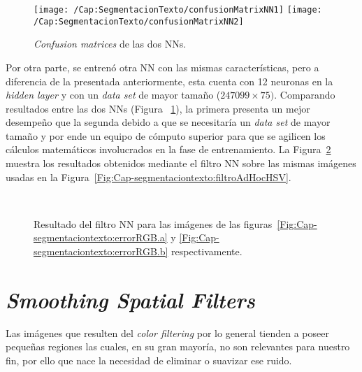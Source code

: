 \begin{figure}[h!]
	\centering
  \texttt{[image: /Cap:SegmentacionTexto/confusionMatrixNN1]} { }
	\texttt{[image: /Cap:SegmentacionTexto/confusionMatrixNN2]}
	\caption{\textit{Confusion matrices} de las dos NNs.}
	\label{Fig:Cap-segmentaciontexto:confusionMatrixNNs}
\end{figure}

Por otra parte, se entrenó otra NN con las mismas características, pero a 
diferencia de la presentada anteriormente, esta cuenta con 12 neuronas en la
\textit{hidden layer} y con un \textit{data set} de mayor tamaño ($247099 \times
75)$. Comparando resultados entre las dos NNs (Figura
~\ref{Fig:Cap-segmentaciontexto:confusionMatrixNNs}), la primera presenta un
mejor desempeño que la segunda debido a que se necesitaría un \textit{data set}
de mayor tamaño y por ende un equipo de cómputo superior para que se agilicen
los cálculos matemáticos involucrados en la fase de entrenamiento. La
Figura~\ref{Fig:Cap-segmentaciontexto:resultadoNN} muestra los resultados
obtenidos mediante el filtro NN sobre las mismas imágenes usadas en la
Figura~\ref{Fig:Cap-segmentaciontexto:filtroAdHocHSV}.

\begin{figure}[h!]
	\centering
   { }
   \\
	\caption{Resultado del filtro NN para las imágenes de las figuras~\ref{Fig:Cap-segmentaciontexto:errorRGB.a} y \ref{Fig:Cap-segmentaciontexto:errorRGB.b} respectivamente.}
	\label{Fig:Cap-segmentaciontexto:resultadoNN}
\end{figure}

\section{\textit{Smoothing Spatial Filters}}
Las imágenes que resulten del \textit{color filtering} por lo general tienden 
a poseer pequeñas regiones las cuales, en su gran mayoría, no son relevantes
para nuestro fin, por ello que nace la necesidad de eliminar o suavizar ese
ruido.

